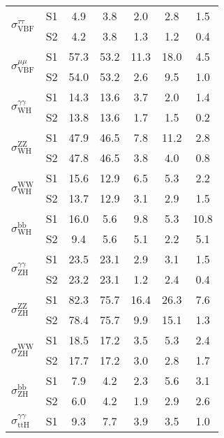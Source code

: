 \begin{tabular}{@{} l c c@{\hskip 0.15in} c c c c @{}}
\multirow{2}{*}{$\sigma_{\mathrm{VBF}}^{\tau \tau }$} & S1  & 4.9& 3.8 & 2.0 & 2.8 & 1.5  \\[1pt]
                        & S2  & 4.2& 3.8 & 1.3 & 1.2 & 0.4  \\[4pt]
\multirow{2}{*}{$\sigma_{\mathrm{VBF}}^{\mu \mu }$} & S1  & 57.3& 53.2 & 11.3 & 18.0 & 4.5  \\[1pt]
                        & S2  & 54.0& 53.2 & 2.6 & 9.5 & 1.0  \\[4pt]
\multirow{2}{*}{$\sigma_{\mathrm{WH}}^{\gamma \gamma }$} & S1  & 14.3& 13.6 & 3.7 & 2.0 & 1.4  \\[1pt]
                        & S2  & 13.8& 13.6 & 1.7 & 1.5 & 0.2  \\[4pt]
\multirow{2}{*}{$\sigma_{\mathrm{WH}}^{\mathrm{ZZ}}$} & S1  & 47.9& 46.5 & 7.8 & 11.2 & 2.8  \\[1pt]
                        & S2  & 47.8& 46.5 & 3.8 & 4.0 & 0.8  \\[4pt]
\multirow{2}{*}{$\sigma_{\mathrm{WH}}^{\mathrm{WW}}$} & S1  & 15.6& 12.9 & 6.5 & 5.3 & 2.2  \\[1pt]
                        & S2  & 13.7& 12.9 & 3.1 & 2.9 & 1.5  \\[4pt]
\multirow{2}{*}{$\sigma_{\mathrm{WH}}^{\mathrm{bb}}$} & S1  & 16.0& 5.6 & 9.8 & 5.3 & 10.8  \\[1pt]
                        & S2  & 9.4& 5.6 & 5.1 & 2.2 & 5.1  \\[4pt]
\multirow{2}{*}{$\sigma_{\mathrm{ZH}}^{\gamma \gamma }$} & S1  & 23.5& 23.1 & 2.9 & 3.1 & 1.5  \\[1pt]
                        & S2  & 23.2& 23.1 & 1.2 & 2.4 & 0.4  \\[4pt]
\multirow{2}{*}{$\sigma_{\mathrm{ZH}}^{\mathrm{ZZ}}$} & S1  & 82.3& 75.7 & 16.4 & 26.3 & 7.6  \\[1pt]
                        & S2  & 78.4& 75.7 & 9.9 & 15.1 & 1.3  \\[4pt]
\multirow{2}{*}{$\sigma_{\mathrm{ZH}}^{\mathrm{WW}}$} & S1  & 18.5& 17.2 & 3.5 & 5.3 & 2.4  \\[1pt]
                        & S2  & 17.7& 17.2 & 3.0 & 2.8 & 1.7  \\[4pt]
\multirow{2}{*}{$\sigma_{\mathrm{ZH}}^{\mathrm{bb}}$} & S1  & 7.9& 4.2 & 2.3 & 5.6 & 3.1  \\[1pt]
                        & S2  & 6.0& 4.2 & 1.9 & 2.9 & 2.6  \\[4pt]
\multirow{2}{*}{$\sigma_{\mathrm{ttH}}^{\gamma \gamma }$} & S1  & 9.3& 7.7 & 3.9 & 3.5 & 1.0  \\[1pt]

\end{tabular}
